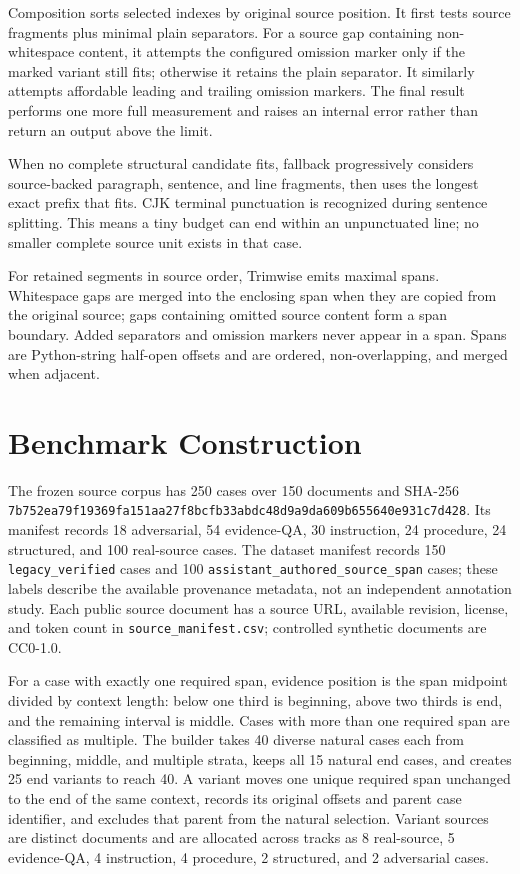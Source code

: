 \documentclass[
]{article}
\begin{document}
Composition sorts selected indexes by original source position. It first
tests source fragments plus minimal plain separators. For a source gap
containing non-whitespace content, it attempts the configured omission
marker only if the marked variant still fits; otherwise it retains the
plain separator. It similarly attempts affordable leading and trailing
omission markers. The final result performs one more full measurement
and raises an internal error rather than return an output above the
limit.

When no complete structural candidate fits, fallback progressively
considers source-backed paragraph, sentence, and line fragments, then
uses the longest exact prefix that fits. CJK terminal punctuation is
recognized during sentence splitting. This means a tiny budget can end
within an unpunctuated line; no smaller complete source unit exists in
that case.

For retained segments in source order, Trimwise emits maximal spans.
Whitespace gaps are merged into the enclosing span when they are copied
from the original source; gaps containing omitted source content form a
span boundary. Added separators and omission markers never appear in a
span. Spans are Python-string half-open offsets and are ordered,
non-overlapping, and merged when adjacent.

\section{Benchmark Construction}\label{benchmark-construction}

The frozen source corpus has 250 cases over 150 documents and SHA-256
\texttt{7b752ea79f19369fa151aa27f8bcfb33abdc48d9a9da609b655640e931c7d428}.
Its manifest records 18 adversarial, 54 evidence-QA, 30 instruction, 24
procedure, 24 structured, and 100 real-source cases. The dataset
manifest records 150 \texttt{legacy\_verified} cases and 100
\texttt{assistant\_authored\_source\_span} cases; these labels describe
the available provenance metadata, not an independent annotation study.
Each public source document has a source URL, available revision,
license, and token count in \texttt{source\_manifest.csv}; controlled
synthetic documents are CC0-1.0.

For a case with exactly one required span, evidence position is the span
midpoint divided by context length: below one third is beginning, above
two thirds is end, and the remaining interval is middle. Cases with more
than one required span are classified as multiple. The builder takes 40
diverse natural cases each from beginning, middle, and multiple strata,
keeps all 15 natural end cases, and creates 25 end variants to reach 40.
A variant moves one unique required span unchanged to the end of the
same context, records its original offsets and parent case identifier,
and excludes that parent from the natural selection. Variant sources are
distinct documents and are allocated across tracks as 8 real-source, 5
evidence-QA, 4 instruction, 4 procedure, 2 structured, and 2 adversarial
cases.
\end{document}
